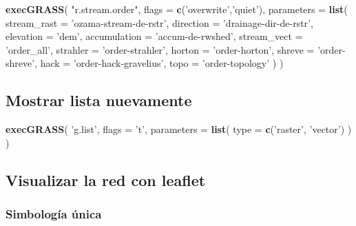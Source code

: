 \documentclass[11pt,]{article}
\newenvironment{Shaded}{\begin{snugshade}}{\end{snugshade}}
\newcommand{\KeywordTok}[1]{\textcolor[rgb]{0.13,0.29,0.53}{\textbf{#1}}}
\newcommand{\DataTypeTok}[1]{\textcolor[rgb]{0.13,0.29,0.53}{#1}}
\newcommand{\StringTok}[1]{\textcolor[rgb]{0.31,0.60,0.02}{#1}}
\newcommand{\NormalTok}[1]{#1}
\begin{document}
\begin{Shaded}
\begin{Highlighting}[]
\KeywordTok{execGRASS}\NormalTok{(}
  \StringTok{"r.stream.order"}\NormalTok{,}
  \DataTypeTok{flags =} \KeywordTok{c}\NormalTok{(}\StringTok{'overwrite'}\NormalTok{,}\StringTok{'quiet'}\NormalTok{),}
  \DataTypeTok{parameters =} \KeywordTok{list}\NormalTok{(}
    \DataTypeTok{stream_rast =} \StringTok{'ozama-stream-de-rstr'}\NormalTok{,}
    \DataTypeTok{direction =} \StringTok{'drainage-dir-de-rstr'}\NormalTok{,}
    \DataTypeTok{elevation =} \StringTok{'dem'}\NormalTok{,}
    \DataTypeTok{accumulation =} \StringTok{'accum-de-rwshed'}\NormalTok{,}
    \DataTypeTok{stream_vect =} \StringTok{'order_all'}\NormalTok{,}
    \DataTypeTok{strahler =} \StringTok{'order-strahler'}\NormalTok{,}
    \DataTypeTok{horton =} \StringTok{'order-horton'}\NormalTok{,}
    \DataTypeTok{shreve =} \StringTok{'order-shreve'}\NormalTok{,}
    \DataTypeTok{hack =} \StringTok{'order-hack-gravelius'}\NormalTok{,}
    \DataTypeTok{topo =} \StringTok{'order-topology'}
\NormalTok{  )}
\NormalTok{)}
\end{Highlighting}
\end{Shaded}

\subsection{Mostrar lista nuevamente}\label{mostrar-lista-nuevamente-1}

\begin{Shaded}
\begin{Highlighting}[]
\KeywordTok{execGRASS}\NormalTok{(}
  \StringTok{'g.list'}\NormalTok{,}
  \DataTypeTok{flags =} \StringTok{'t'}\NormalTok{,}
  \DataTypeTok{parameters =} \KeywordTok{list}\NormalTok{(}
    \DataTypeTok{type =} \KeywordTok{c}\NormalTok{(}\StringTok{'raster'}\NormalTok{, }\StringTok{'vector'}\NormalTok{)}
\NormalTok{  )}
\NormalTok{)}
\end{Highlighting}
\end{Shaded}

\subsection{Visualizar la red con
leaflet}\label{visualizar-la-red-con-leaflet}

\subsubsection{Simbología única}\label{simbologuxeda-uxfanica}
\end{document}
